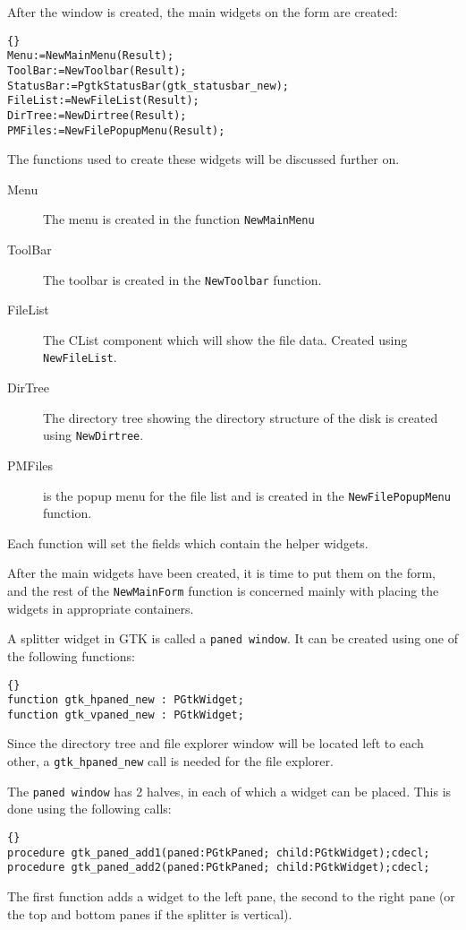 \documentclass[10pt]{article}
\begin{document}
After the window is created, the main widgets on the form are created:
\begin{lstlisting}{}
Menu:=NewMainMenu(Result);
ToolBar:=NewToolbar(Result);
StatusBar:=PgtkStatusBar(gtk_statusbar_new);
FileList:=NewFileList(Result);
DirTree:=NewDirtree(Result);
PMFiles:=NewFilePopupMenu(Result);
\end{lstlisting}

The functions used to create these widgets will be discussed further on.
\begin{description}
\item[Menu] The menu is created in the function \lstinline|NewMainMenu|
\item[ToolBar] The toolbar is created in the \lstinline|NewToolbar| function.
\item[FileList] The CList component which will show the file data. Created
using \lstinline|NewFileList|.
\item[DirTree] The directory tree showing the directory structure of the
disk is created using \lstinline|NewDirtree|.
\item[PMFiles] is the popup menu for the file list and is created in the
\lstinline|NewFilePopupMenu| function.
\end{description}
Each function will set the fields which contain the helper widgets.

After the main widgets have been created, it is time to put them on the
form, and the rest of the \lstinline|NewMainForm| function is concerned 
mainly with  placing the widgets in appropriate containers. 

A splitter widget in GTK is called a \lstinline|paned window|. It can be created
using one of the following functions:
\begin{lstlisting}{}
function gtk_hpaned_new : PGtkWidget;
function gtk_vpaned_new : PGtkWidget;
\end{lstlisting}
Since the directory tree and file explorer window will be located left to
each other, a \lstinline|gtk_hpaned_new| call is needed for the file explorer.

The \lstinline|paned window| has 2 halves, in each of which a widget can be
placed. This is done using the following calls:
\begin{lstlisting}{}
procedure gtk_paned_add1(paned:PGtkPaned; child:PGtkWidget);cdecl;
procedure gtk_paned_add2(paned:PGtkPaned; child:PGtkWidget);cdecl;
\end{lstlisting}
The first function adds a widget to the left pane, the second to the right
pane (or the top and bottom panes if the splitter is vertical).
\end{document}
